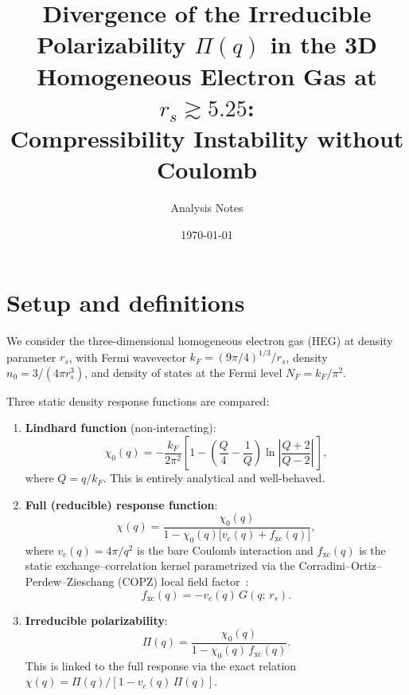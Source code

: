 \documentclass[aps,prb,twocolumn,superscriptaddress,floatfix]{revtex4-2}
\begin{document}
\title{Divergence of the Irreducible Polarizability $\Pi(q)$ in the 3D Homogeneous Electron Gas at $r_s \gtrsim 5.25$: \\
    Compressibility Instability without Coulomb}

\author{Analysis Notes}
\date{\today}

\maketitle

\section{Setup and definitions}

We consider the three-dimensional homogeneous electron gas (HEG) at density
parameter $r_s$, with Fermi wavevector $k_F = (9\pi/4)^{1/3}/r_s$,
density $n_0 = 3/(4\pi r_s^3)$, and density of states at the Fermi level
$N_F = k_F / \pi^2$.

Three static density response functions are compared:

\begin{enumerate}
    \item \textbf{Lindhard function} (non-interacting):
          \begin{equation}
              \chi_0(q) = -\frac{k_F}{2\pi^2}
              \left[1 - \left(\frac{Q}{4} - \frac{1}{Q}\right)
                  \ln\!\left|\frac{Q+2}{Q-2}\right|\,\right],
              \label{eq:lindhard}
          \end{equation}
          where $Q = q/k_F$.  This is entirely analytical and well-behaved.

    \item \textbf{Full (reducible) response function}:
          \begin{equation}
              \chi(q) = \frac{\chi_0(q)}{1 - \chi_0(q)\bigl[v_c(q) + f_{\mathrm{xc}}(q)\bigr]},
              \label{eq:chi}
          \end{equation}
          where $v_c(q) = 4\pi/q^2$ is the bare Coulomb interaction
          and $f_{\mathrm{xc}}(q)$ is the static exchange--correlation kernel
          parametrized via the Corradini--Ortiz--Perdew--Zieschang (COPZ) local
          field factor~\cite{Corradini1998}:
          \begin{equation}
              f_{\mathrm{xc}}(q) = -v_c(q)\, G(q;\, r_s).
              \label{eq:fxc}
          \end{equation}

    \item \textbf{Irreducible polarizability}:
          \begin{equation}
              \Pi(q) = \frac{\chi_0(q)}{1 - \chi_0(q)\, f_{\mathrm{xc}}(q)}.
              \label{eq:pi}
          \end{equation}
          This is linked to the full response via the exact relation
          $\chi(q) = \Pi(q) / [1 - v_c(q)\,\Pi(q)]$.
\end{enumerate}
\end{document}
